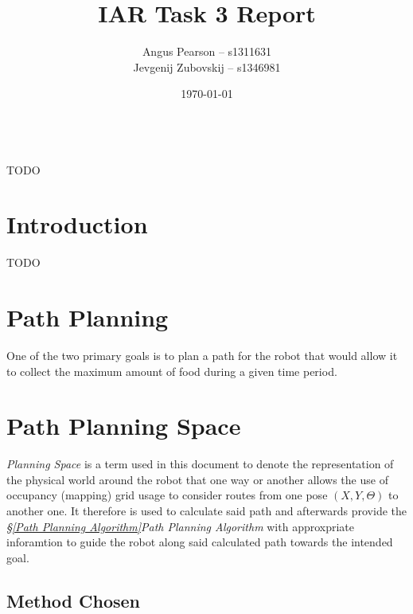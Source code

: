 \documentclass[11pt, a4paper]{article}
\renewenvironment{abstract}{%
{\mdseries\scshape\Large\abstractname}
\vspace{1em}\\
}{\par\noindent}
\begin{document}
\title{IAR Task 3 Report}
\author{Angus Pearson -- s1311631\\ Jevgenij Zubovskij -- s1346981}
\date{\today}
\maketitle



\begin{abstract}
 

TODO


\end{abstract}



\section{Introduction}
\label{Introduction}

TODO



\newpage
\section{Path Planning}
\label{Pathing}

One of the two primary goals is to plan a path for the robot that would allow it to collect the maximum amount of food during a given time period. 

\section{Path Planning Space}
\label{Planning Space}

\textit{Planning Space} is a term used in this document to denote the representation of the physical world around the robot that one way or another allows the use of occupancy (mapping) grid usage to consider routes from one pose $(X,Y, \Theta)$ to another one. It therefore is used to calculate said path and afterwards provide the \textit{\S\ref{Path Planning Algorithm}Path Planning Algorithm} with approxpriate inforamtion to guide the robot along said calculated path towards the intended goal.

\subsection{Method Chosen}
\end{document}
